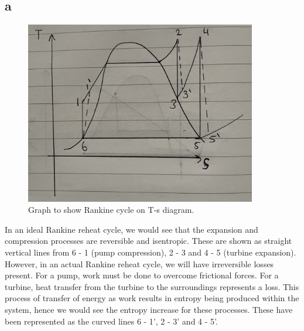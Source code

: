 \documentclass[11pt]{article}
\numberwithin{equation}{section}
\begin{document}
\subsection{a}
\begin{figure}[H]
    \centering
    \includegraphics[height = 8cm]{./img/q5a.jpg}
    \caption{Graph to show Rankine cycle on T-s diagram.}
    \label{fig:q5a}
\end{figure}
In an ideal Rankine reheat cycle, we would see that the expansion and compression processes are reversible and isentropic. These are shown as straight vertical lines from 6 - 1 (pump compression), 2 - 3 and 4 - 5 (turbine expansion). However, in an actual Rankine reheat cycle, we will have irreversible losses present. For a pump, work must be done to overcome frictional forces. For a turbine, heat transfer from the turbine to the surroundings represents a loss. This process of transfer of energy as work results in entropy being produced within the system, hence we would see the entropy increase for these processes. These have been represented as the curved lines 6 - 1', 2 - 3' and 4 - 5'. 
\end{document}

